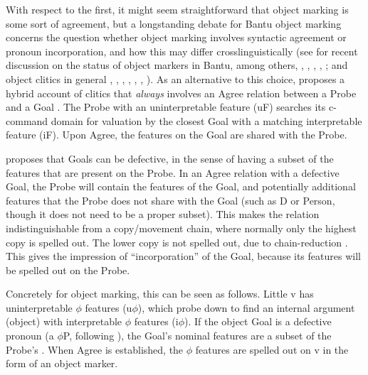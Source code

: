 \documentclass[output=paper
,modfonts
,nonflat]{langsci/langscibook}
\begin{document}
With respect to the first, it might seem straightforward that object marking is some sort of agreement, but a longstanding debate for Bantu object marking concerns the question whether object marking involves syntactic agreement or pronoun incorporation, and how this may differ crosslinguistically (see for recent discussion on the status of object markers in Bantu, among others, \citealt{Henderson2006}, \citealt{Riedel2009}, \citealt{Zeller2012}, \citealt{Iorio2014}, \citealt{Baker2016}; and object clitics in general \citealt{Preminger2009}, \citealt{Nevins2011}, \citealt{Anagnostopoulou2014}, \citealt{Anagnostopoulou2016}, \citealt{Kramer2014}, \citealt{Harizanov2014}, \citealt{Baker_Kramer2016}). As an alternative to this choice, \citet{Roberts2010} proposes a hybrid account of clitics that \textit{always} involves an Agree relation between a Probe and a Goal \citep{Chomsky2000, Chomsky2001}. The Probe with an uninterpretable feature (uF) searches its c-command domain for valuation by the closest Goal with a matching interpretable feature (iF). Upon Agree, the features on the Goal are shared with the Probe.

\citet{Roberts2010} proposes that Goals can be defective, in the sense of having a subset of the features that are present on the Probe. In an Agree relation with a defective Goal, the Probe will contain the features of the Goal, and potentially additional features that the Probe does not share with the Goal (such as D or Person, though it does not need to be a proper subset). This makes the relation indistinguishable from a copy/movement chain, where normally only the highest copy is spelled out. The lower copy is not spelled out, due to chain-reduction \citep{Nunes2004}. This gives the impression of “incorporation” of the Goal, because its features will be spelled out on the Probe.

Concretely for object marking, this can be seen as follows. Little v has uninterpretable $\phi $ features (u$\phi$), which probe down to find an internal argument (object) with interpretable $\phi$ features (i$\phi$). If the object Goal is a defective pronoun (a $\phi$P, following \citealt{Déchaine_Wiltschko2002}), the Goal’s nominal features are a subset of the Probe’s . When Agree is established, the $\phi$ features are spelled out on v in the form of an object marker.
\end{document}

